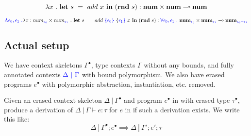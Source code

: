 \begin{example}
  \begin{equation}
    \lambda x \ . \ \mathbf{let} \ s \ = \ add \ x \ \tin \ (\mathbf{rnd} \ s)
    : \textbf{num} \times \textbf{num} \multimap \textbf{num}
  \end{equation}
\end{example}
\begin{example}
  \begin{equation}
    \bnd{\Lambda \epsilon_0, \epsilon_1 \ .} \lambda x : num_{\bnd{\epsilon_0}}
    \times num_{\bnd{\epsilon_1}} \ . \ 
    \mathbf{let} \ s \ = \ add \ \bnd{\{\epsilon_0\}} \ \{\bnd{\epsilon_1\}} \ x
    \ \tin \ (\mathbf{rnd} \ s)
    : 
    \bnd{\forall \epsilon_0, \epsilon_1 \ .} \ 
    \textbf{num}_{\bnd{\epsilon_0}} \times \textbf{num}_{\bnd{\epsilon_1}}
    \multimap
    \textbf{num}_{\bnd{\epsilon_0 + \epsilon_1}}
  \end{equation}
\end{example}

\subsection{Actual setup}

We have context skeletons $\Gamma^{\bullet}$, type contexts $\Gamma$ without any
bounds, and fully annotated contexts $\textcolor{blue}{\Delta \ | \ \Gamma}$ with bound
polymorphism. 
We also have erased programs $e^{\bullet}$ with polymorphic abstraction,
instantiation, etc. removed.


\begin{definition}
Given an erased context skeleton $\Delta \ | \ \Gamma^{\bullet}$ and program
$e^{\bullet}$ in \Lang with erased type $\tau^{\bullet}$, produce a derivation
of $\Delta \ | \ \Gamma \vdash e : \tau$ for $e$ in \bnd{\Lang} if such a
derivation exists. We write this like: $$\Delta \ | \ \Gamma^{\bullet};
e^{\bullet} \implies \Delta \ | \ \Gamma'; e'; \tau$$
\end{definition}

